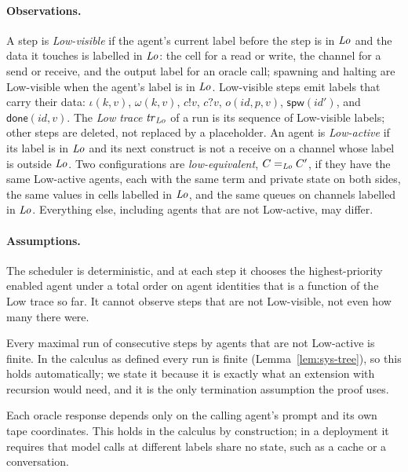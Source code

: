 \paragraph{Observations.}
A step is \emph{Low-visible} if the agent's current label before the step is in $\mathit{Lo}$ and the
data it touches is labelled in $\mathit{Lo}$: the cell for a read or write, the channel for a send or
receive, and the output label for an oracle call; spawning and halting are Low-visible when the
agent's label is in $\mathit{Lo}$.
Low-visible steps emit labels that carry their data: $\iota(k, v)$, $\omega(k, v)$, $c!v$,
$c?v$, $o(\mathit{id}, p, v)$, $\mathsf{spw}(\mathit{id}')$, and $\mathsf{done}(\mathit{id},
v)$.
The \emph{Low trace} $\mathit{tr}_{\mathit{Lo}}$ of a run is its sequence of Low-visible labels; other
steps are deleted, not replaced by a placeholder.
An agent is \emph{Low-active} if its label is in $\mathit{Lo}$ and its next construct is not a receive
on a channel whose label is outside $\mathit{Lo}$.
Two configurations are \emph{low-equivalent}, $C =_{\mathit{Lo}} C'$, if they have the same Low-active
agents, each with the same term and private state on both sides, the same values in cells
labelled in $\mathit{Lo}$, and the same queues on channels labelled in $\mathit{Lo}$.
Everything else, including agents that are not Low-active, may differ.

\paragraph{Assumptions.}
\begin{description}[noitemsep]
  \item[(A-SCHED)] The scheduler is deterministic, and at each step it chooses the
    highest-priority enabled agent under a total order on agent identities that is a function
    of the Low trace so far. It cannot observe steps that are not Low-visible, not even how
    many there were.
  \item[(A-TERM)] Every maximal run of consecutive steps by agents that are not Low-active is
    finite. In the calculus as defined every run is finite (Lemma~\ref{lem:sys-tree}), so this
    holds automatically; we state it because it is exactly what an extension with recursion
    would need, and it is the only termination assumption the proof uses.
  \item[(A-ORC)] Each oracle response depends only on the calling agent's prompt and its own
    tape coordinates. This holds in the calculus by construction; in a deployment it requires
    that model calls at different labels share no state, such as a cache or a conversation.
\end{description}

